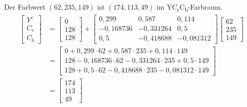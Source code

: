 \documentclass[
  ngerman,
  DIV=14
]{scrartcl}
\begin{document}
Der Farbwert $(62,235,149)$ ist $(174, 113, 49)$ im YC\textsubscript{r}C\textsubscript{b}-Farbraum.
\begin{align*}
\begin{bmatrix}Y'\\C_r\\C_b\end{bmatrix}
&= \begin{bmatrix}0\\128\\128\end{bmatrix}
+ \begin{bmatrix}0,299&0,587&0,114\\-0,168736&-0,331264&0,5\\0,5&-0,418688&-0,081312\end{bmatrix}
\begin{bmatrix}62\\235\\149\end{bmatrix}\\
&= \begin{bmatrix}
0+0,299\cdot62+0,587\cdot235+0,114\cdot149\\
128−0,168736\cdot62−0,331264\cdot235+0,5\cdot149\\
128+0,5\cdot62-0,418688\cdot235-0,081312\cdot 149
\end{bmatrix}\\
&= \begin{bmatrix}174\\113\\49\end{bmatrix}
\end{align*}
\end{document}
